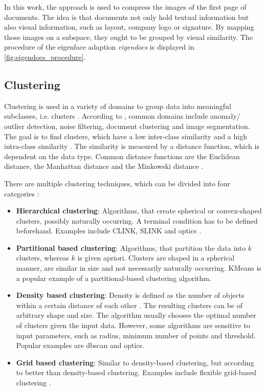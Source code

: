 In this work, the \eigenfaces{} approach is used to compress the images of the first page of documents.
The idea is that documents not only hold textual information but also visual information, such as layout, company logo or signature.
By mapping those images on a subspace, they ought to be grouped by visual similarity.
The procedure of the eigenface adaption \textit{eigendocs} is displayed in \autoref{fig:eigendocs_procedure}.



\subsection{Clustering}\label{subsec:clustering}

Clustering is used in a variety of domains to group data into meaningful subclasses, i.e. clusters \cite{OPTICS2013, OPTICS2014, OPTICS_kMeans_2016}.
According to \citeauthor{OPTICS2013}, common domains include anomaly/ outlier detection, noise filtering, document clustering and image segmentation. 
The goal is to find clusters, which have a low inter-class similarity and a high intra-class similarity \cite{OPTICS2013}.
The similarity is measured by a distance function, which is dependent on the data type. 
Common distance functions are the Euclidean distance, the Manhattan distance and the Minkowski distance \cite{OPTICS_kMeans_2016}.

There are multiple clustering techniques, which can be divided into four categories \cite{OPTICS2016}: 
\begin{itemize}
    \item \textbf{Hierarchical clustering}:
    Algorithms, that create spherical or convex-shaped clusters, possibly naturally occurring. 
    A terminal condition has to be defined beforehand.
    Examples include CLINK, SLINK \cite{OPTICS2014} and \ac{optics} \cite{OPTICS2013}.

    \item \textbf{Partitional based clustering}: 
    Algorithms, that partition the data into $k$ clusters, whereas $k$ is given apriori.
    Clusters are shaped in a spherical manner, are similar in size and not necessarily naturally occurring.
    KMeans is a popular example of a partitional-based clustering algorithm.

    \item \textbf{Density based clustering}:
    Density is defined as the number of objects within a certain distance of each other \cite{OPTICS_kMeans_2016}.
    The resulting clusters can be of arbitrary shape and size.
    The algorithm usually chooses the optimal number of clusters given the input data.
    However, some algorithms are sensitive to input parameters, such as radius, minimum number of points and threshold.
    Popular examples are \ac{dbscan} and \ac{optics}.
    
    \item \textbf{Grid based clustering}:
    Similar to density-based clustering, but according to \citeauthor{OPTICS2016} better than density-based clustering.
    Examples include flexible grid-based clustering \cite{OPTICS2014}.
    
\end{itemize}


